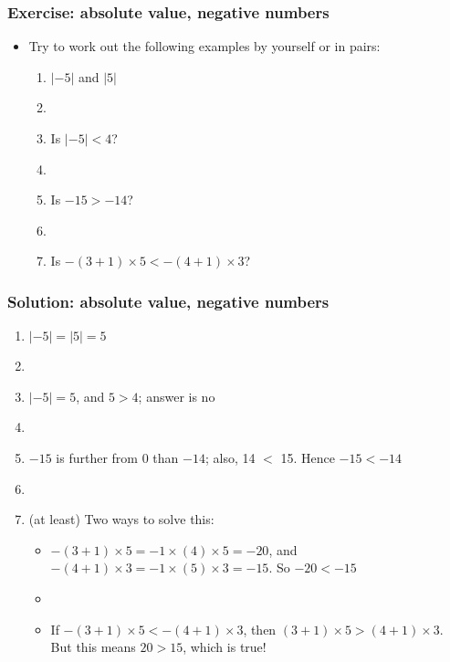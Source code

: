 \documentclass[11pt,dvipsnames]{beamer}
\newcommand{\myframe}[1]{\begin{frame} \frametitle{#1}}
\begin{document}
\myframe{Exercise: absolute value, negative numbers}
\begin{itemize}
\item Try to work out the following examples by yourself or in pairs:
\begin{enumerate}
\item $|-5|$ and $|5|$
\item[]
\item Is $|-5| < 4$?
\item[]
\item Is $-15 > -14$? 
\item[]
\item Is $-(3 + 1)\times 5 < -(4 + 1)\times 3$?
\end{enumerate}
\end{itemize}
\end{frame}

\myframe{Solution: absolute value, negative numbers}
\begin{enumerate}
\item $|-5| = |5| = 5$
\item[]
\item $|-5| = 5$, and $5 > 4$; answer is no
\item[]
\item $-15$ is further from 0 than $-14$; also, 14 $<$ 15. Hence $-15 < -14$
\item[]
\item (at least) Two ways to solve this: \pause
\begin{itemize}
\item $-(3+1)\times 5 = -1\times(4)\times 5 = -20$, and $-(4+1)\times 3 = -1\times (5) \times 3 = -15$. So $-20 < -15$
\item[] \pause
\item If $-(3+1)\times 5 < -(4+1)\times 3$, then $(3+1)\times 5 > (4+1)\times 3$. But this means $20 > 15$, which is true!
\end{itemize}
\end{enumerate}
\end{frame}
\end{document}
